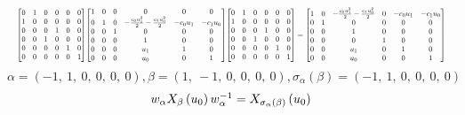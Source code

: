 \documentclass[11pt]{article}
\theoremstyle{definition}
\begin{document}
\[
\scaletoalign{\textwidth}{{\left[\begin{matrix}0 & 1 & 0 & 0 & 0 & 0\\1 & 0 & 0 & 0 & 0 & 0\\0 & 0 & 0 & 1 & 0 & 0\\0 & 0 & 1 & 0 & 0 & 0\\0 & 0 & 0 & 0 & 1 & 0\\0 & 0 & 0 & 0 & 0 & 1\end{matrix}\right]} {\left[\begin{matrix}1 & 0 & 0 & 0 & 0 & 0\\0 & 1 & 0 & - \frac{c_{0} u_{1}^{2}}{2} - \frac{c_{1} u_{0}^{2}}{2} & - c_{0} u_{1} & - c_{1} u_{0}\\0 & 0 & 1 & 0 & 0 & 0\\0 & 0 & 0 & 1 & 0 & 0\\0 & 0 & 0 & u_{1} & 1 & 0\\0 & 0 & 0 & u_{0} & 0 & 1\end{matrix}\right]} {\left[\begin{matrix}0 & 1 & 0 & 0 & 0 & 0\\1 & 0 & 0 & 0 & 0 & 0\\0 & 0 & 0 & 1 & 0 & 0\\0 & 0 & 1 & 0 & 0 & 0\\0 & 0 & 0 & 0 & 1 & 0\\0 & 0 & 0 & 0 & 0 & 1\end{matrix}\right]} = {\left[\begin{matrix}1 & 0 & - \frac{c_{0} u_{1}^{2}}{2} - \frac{c_{1} u_{0}^{2}}{2} & 0 & - c_{0} u_{1} & - c_{1} u_{0}\\0 & 1 & 0 & 0 & 0 & 0\\0 & 0 & 1 & 0 & 0 & 0\\0 & 0 & 0 & 1 & 0 & 0\\0 & 0 & u_{1} & 0 & 1 & 0\\0 & 0 & u_{0} & 0 & 0 & 1\end{matrix}\right]}}
\]
\[
\alpha = \left( -1, \  1, \  0, \  0, \  0, \  0\right), \beta = \left( 1, \  -1, \  0, \  0, \  0, \  0\right), \sigma_{\alpha}(\beta) = \left( -1, \  1, \  0, \  0, \  0, \  0\right)
\]
\[
\scaletoalign{\textwidth}{w_{\alpha} X_{\beta}\left(u_{0}\right) w_{\alpha}^{-1} = X_{\sigma_{\alpha}\left(\beta\right)}\left(u_{0}\right)}
\]
\end{document}
